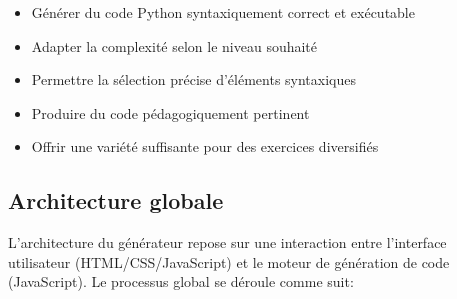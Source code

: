 \documentclass[11pt,a4paper]{article}
\begin{document}
\begin{itemize}
    \item Générer du code Python syntaxiquement correct et exécutable
    \item Adapter la complexité selon le niveau souhaité
    \item Permettre la sélection précise d'éléments syntaxiques
    \item Produire du code pédagogiquement pertinent
    \item Offrir une variété suffisante pour des exercices diversifiés
\end{itemize}

\subsection{Architecture globale}
L'architecture du générateur repose sur une interaction entre l'interface utilisateur (HTML/CSS/JavaScript) et le moteur de génération de code (JavaScript). Le processus global se déroule comme suit:
\end{document}
